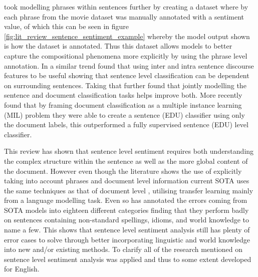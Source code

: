 \citet{socher-etal-2013-recursive} took modelling phrases within sentences further by creating a dataset where by each phrase from the \citet{pang-lee-2005-seeing} movie dataset was manually annotated with a sentiment value, of which this can be seen in figure \ref{fig:lit_review_sentence_sentiment_example} whereby the model output shown is how the dataset is annotated. Thus this dataset allows models to better capture the compositional phenomena more explicitly by using the phrase level annotation. In a similar trend \citet{yang-cardie-2014-context} found that using inter and intra sentence discourse features to be useful showing that sentence level classification can be dependent on surrounding sentences. Taking that further \citet{mcdonald-etal-2007-structured} found that jointly modelling the sentence and document classification tasks helps improve both. More recently \citet{angelidis-lapata-2018-multiple} found that by framing document classification as a multiple instance learning (MIL) \citep{dietterich1997solving} problem they were able to create a sentence (EDU) classifier using only the document labels, this outperformed a fully supervised sentence (EDU) level classifier.  

This review has shown that sentence level sentiment requires both understanding the complex structure within the sentence as well as the more global content of the document. However even though the literature shows the use of explicitly taking into account phrases and document level information current SOTA uses the same techniques as that of document level \citep{yang2019xlnet}, utilising transfer learning mainly from a language modelling task. Even so \citet{barnes-etal-2019-sentiment} has annotated the errors coming from SOTA models into eighteen different categories finding that they perform badly on sentences containing non-standard spellings, idioms, and world knowledge to name a few. This shows that sentence level sentiment analysis still has plenty of error cases to solve through better incorporating linguistic and world knowledge into new and/or existing methods. To clarify all of the research mentioned on sentence level sentiment analysis was applied and thus to some extent developed for English. 


